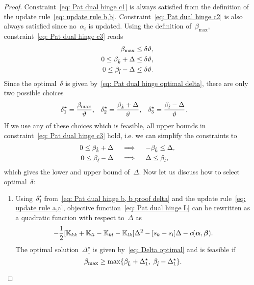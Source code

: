 \begin{proof}
  Constraint~\eqref{eq: Pat dual hinge c1} is always satisfied from the definition of the update rule~\eqref{eq: update rule b,b}. Constraint~\eqref{eq: Pat dual hinge c2} is also always satisfied since no~$\alpha_i$ is updated. Using the definition of~$\beta_{\max},$ constraint~\eqref{eq: Pat dual hinge c3} reads
  \begin{align*}
    \beta_{\max} & \leq \delta \vartheta, \\
    0 \leq \beta_{\hat{k}} + \Delta & \leq \delta \vartheta, \\
    0 \leq \beta_{\hat{l}} - \Delta & \leq \delta \vartheta.
  \end{align*}
  Since the optimal~$\delta$ is given by~\eqref{eq: Pat dual hinge optimal delta}, there are only two possible choices
  \begin{align}\label{eq: Pat dual hinge b, b proof delta}
    \delta^{\star}_1 & = \frac{\beta_{\max}}{\vartheta}, &
    \delta^{\star}_2 & = \frac{\beta_{\hat{k}} + \Delta}{\vartheta}, &
    \delta^{\star}_3 & = \frac{\beta_{\hat{l}} - \Delta}{\vartheta}.
  \end{align}
  If we use any of these choices which is feasible, all upper bounds in constraint~\eqref{eq: Pat dual hinge c3} hold, i.e. we can simplify the constraints to
  \begin{align*}
    0 \leq \beta_{\hat{k}} + \Delta
    & \quad \implies \quad
    - \beta_{\hat{k}} \leq \Delta, \\
    0 \leq \beta_{\hat{l}} - \Delta
    & \quad \implies \quad
    \Delta \leq \beta_{\hat{l}},
  \end{align*}
  which gives the lower and upper bound of~$\Delta.$ Now let us discuss how to select optimal~$\delta:$
  \begin{enumerate}
    \item Using~$\delta^{\star}_1$ from~\eqref{eq: Pat dual hinge b, b proof delta} and the update rule~\eqref{eq: update rule a,a}, objective function~\eqref{eq: Pat dual hinge L} can be rewritten as a quadratic function with respect to~$\Delta$ as
    \begin{equation*}
      - \frac{1}{2} \Brac[s]{\K_{kk} + \K_{ll} - \K_{kl} - \K_{lk}} \Delta^2
      - \Brac[s]{s_k - s_l} \Delta
      - c(\bm{\alpha}, \bm{\beta}).
    \end{equation*}
    The optimal solution~$\Delta^{\star}_1$ is given by~\eqref{eq: Delta optimal} and is feasible if
    \begin{equation*}
      \beta_{\max} \geq \max\{\beta_{\hat{k}} + \Delta^{\star}_1, \; \beta_{\hat{l}} - \Delta^{\star}_1\}.
    \end{equation*}


\end{enumerate}
\end{proof}
